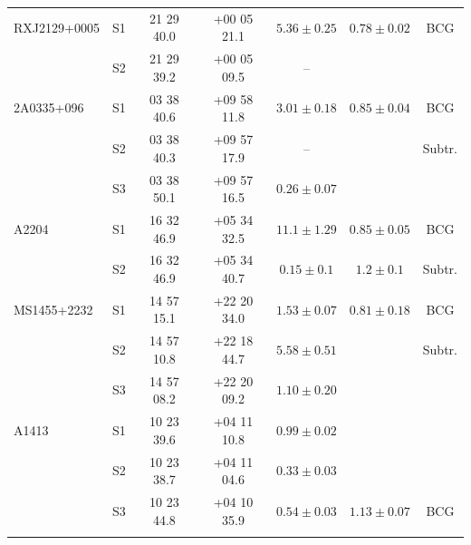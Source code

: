 \begin{table}
\begin{threeparttable}
\begin{tabular}{lcccccc}
                RXJ2129+0005    & S1            & 21 29 40.0        & +00 05 21.1           & $5.36\pm0.25$              & $0.78\pm0.02$ & BCG \\
                                & S2            & 21 29 39.2        & +00 05 09.5           & --                         &  & \\
                \addlinespace[0.5em]
                
                2A0335+096\tnote{*}      & S1            & 03 38 40.6        & +09 58 11.8           & $3.01\pm0.18$              & $0.85\pm0.04$ & BCG\\
                                & S2            & 03 38 40.3        & +09 57 17.9           & --                         &  & Subtr.\\                
                                & S3            & 03 38 50.1        & +09 57 16.5           & $0.26\pm0.07$              &  & \\
                \addlinespace[0.5em]
                
                A2204\tnote{*}           & S1            & 16 32 46.9        & +05 34 32.5           & $11.1\pm1.29$              & $0.85\pm0.05$ & BCG\\
                                & S2            & 16 32 46.9        & +05 34 40.7           & $0.15\pm0.1$               & $1.2\pm0.1$ & Subtr.\\
                \addlinespace[0.5em]
                
                MS1455+2232\tnote{*}     & S1            & 14 57 15.1        & +22 20 34.0           & $1.53\pm0.07$              & $0.81\pm0.18$\tnote{**} & BCG\\
                                & S2            & 14 57 10.8        & +22 18 44.7           & $5.58\pm0.51$              &  & Subtr.\\
                                & S3            & 14 57 08.2        & +22 20 09.2           & $1.10\pm0.20$              &  & \\
                \addlinespace[0.5em]
                
                A1413\tnote{*}           & S1            & 10 23 39.6        & +04 11 10.8           & $0.99\pm0.02$              &  & \\
                                & S2            & 10 23 38.7        & +04 11 04.6           & $0.33\pm0.03$              &  & \\
                                & S3            & 10 23 44.8        & +04 10 35.9           & $0.54\pm0.03$              & $1.13\pm0.07$\tnote{\Cross} & BCG \\
                \addlinespace[0.5em]
                

\end{tabular}
\end{threeparttable}
\end{table}
